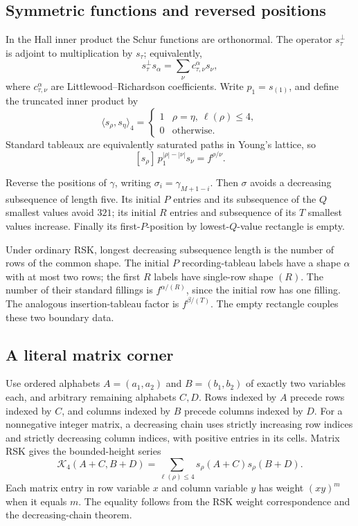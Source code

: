 \documentclass[11pt,letterpaper]{article}
\theoremstyle{remark}\newtheorem{remark}[theorem]{Remark}
\numberwithin{equation}{section}
\newcommand{\ip}[2]{\langle #1,#2\rangle_4}
\begin{document}
\subsection{Symmetric functions and reversed positions}
In the Hall inner product the Schur functions are orthonormal.
The operator $s_\tau^\perp$ is adjoint to multiplication by $s_\tau$;
equivalently,
\[
 s_\tau^\perp s_\alpha
   =\sum_\nu c^\alpha_{\tau,\nu}s_\nu,
\]
where $c^\alpha_{\tau,\nu}$ are Littlewood--Richardson coefficients.
Write $p_1=s_{(1)}$, and define the truncated inner product by
\[
 \ip{s_\rho}{s_\eta}
  =\begin{cases}1&\rho=\eta,\ \ell(\rho)\le4,\\0&\text{otherwise.}\end{cases}
\]
Standard tableaux are equivalently saturated paths in Young's
lattice, so
\begin{equation}\label{upo:ex5:eq:skewbranch}
 [s_\rho]\,p_1^{|\rho|-|\nu|}s_\nu=f^{\rho/\nu}.
\end{equation}

Reverse the positions of $\gamma$, writing
$\sigma_i=\gamma_{M+1-i}$. Then $\sigma$ avoids a decreasing
subsequence of length five. Its initial $P$ entries and its subsequence
of the $Q$ smallest values avoid $321$; its initial $R$ entries and
subsequence of its $T$ smallest values increase. Finally its
first-$P$-position by lowest-$Q$-value rectangle is empty.

Under ordinary RSK, longest decreasing subsequence length is the
number of rows of the common shape. The initial $P$ recording-tableau
labels have a shape $\alpha$ with at most two rows; the first $R$
labels have single-row shape $(R)$. The number of their standard
fillings is $f^{\alpha/(R)}$, since the initial row has one filling.
The analogous insertion-tableau factor is $f^{\beta/(T)}$.
The empty rectangle couples these two boundary data.

\subsection{A literal matrix corner}
Use ordered alphabets $A=(a_1,a_2)$ and $B=(b_1,b_2)$ of exactly two
variables each, and arbitrary remaining alphabets $C,D$.
Rows indexed by $A$ precede rows indexed by $C$, and columns indexed
by $B$ precede columns indexed by $D$. For a nonnegative integer
matrix, a decreasing chain uses strictly increasing row indices and
strictly decreasing column indices, with positive entries in its
cells. Matrix RSK gives the bounded-height series
\begin{equation}\label{upo:ex5:eq:K4}
 \mathcal K_4(A+C,B+D)
   =\sum_{\ell(\rho)\le4}s_\rho(A+C)s_\rho(B+D).
\end{equation}
Each matrix entry in row variable $x$ and column variable $y$ has
weight $(xy)^m$ when it equals $m$. The equality follows from the
RSK weight correspondence and the decreasing-chain theorem.
\end{document}
